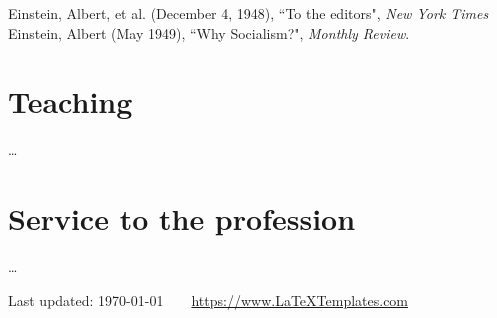\documentclass[12pt]{article} %
\begin{document}
Einstein, Albert, et al. (December 4, 1948), “To the editors", \emph{New York Times}\\
Einstein, Albert (May 1949), “Why Socialism?", \emph{Monthly Review}.


\section*{Teaching}

\ldots


\section*{Service to the profession}

\ldots

\vfill %


\begin{center}
	\scriptsize
	Last updated: \today~~\raisebox{-0.5pt}{\textbullet}~~\href{https://www.LaTeXTemplates.com}{https://www.LaTeXTemplates.com}
\end{center}

\end{document}

